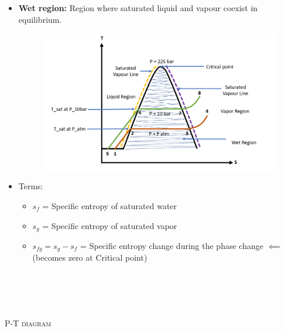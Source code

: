 \documentclass[8pt]{article}
\begin{document}
\begin{itemize}
		\item \textbf{Wet region: } Region where saturated liquid and vapour coexist in equilibrium.
		\begin{figure}[H]
			\includegraphics[scale=0.5]{Phasechange.png}
			\centering
		\end{figure}
		\item Terms:
			\begin{itemize}
				\item $s_f$ = Specific entropy of saturated water
				\item $s_g$ = Specific entropy of saturated vapor
				\item $s_{fg} = s_g - s_f$ = Specific entropy change during the phase change $\impliedby$ (becomes zero at Critical point) 
			\end{itemize}
	\end{itemize}\hrulefill\\\\
\\\\
\textsc{P-T diagram}
\end{document}
